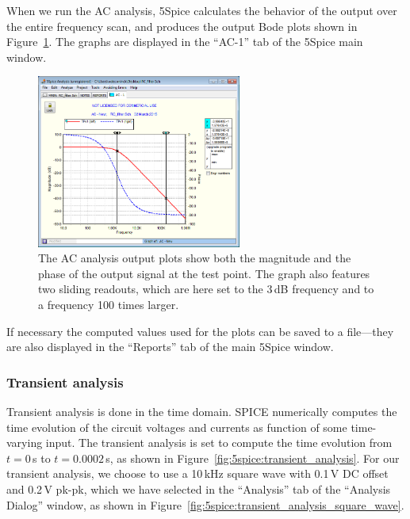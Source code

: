 \documentclass{article}
\begin{document}
When we run the AC analysis, 5Spice calculates the behavior of the output over the entire frequency scan, and produces the output Bode plots shown in Figure~\ref{fig:5spice:AC_analysis_results}. The graphs are displayed in the ``AC-1'' tab of the 5Spice main window.

\begin{figure}
\begin{center}
\includegraphics[width=0.6\textwidth]{pics/5spice_AC_analysis_results}
\end{center}
\caption{The AC analysis output plots show both the magnitude and the phase of the output signal at the test point. The graph also features two sliding readouts, which are here set to the 3\,dB frequency and to a frequency 100 times larger.}
\label{fig:5spice:AC_analysis_results}
\end{figure}

If necessary the computed values used for the plots can be saved to a file---they are also displayed in the ``Reports'' tab of the main 5Spice window.

\subsubsection{Transient analysis}
Transient analysis is done in the time domain. SPICE numerically computes the time evolution of the circuit voltages and currents as function of some time-varying input. The transient analysis is set to compute the time evolution from $t = 0$\,s to $t = 0.0002$\,s, as shown in Figure~\ref{fig:5spice:transient_analysis}.  For our transient analysis, we choose to use a 10\,kHz square wave with 0.1\,V DC offset and 0.2\,V pk-pk, which we have selected in the ``Analysis'' tab of the ``Analysis Dialog'' window, as shown in Figure~\ref{fig:5spice:transient_analysis_square_wave}. 
\end{document}
